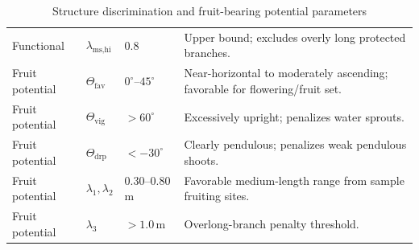 \documentclass[12pt,a4paper,fontset=fandol]{ctexart}
\begin{document}
\begin{table}[H]
\begin{tabularx}{\textwidth}{>{\raggedright\arraybackslash}p{2.1cm}>{\raggedright\arraybackslash}p{2.4cm}>{\raggedright\arraybackslash}p{1.9cm}>{\raggedright\arraybackslash}X}
Functional & $\lambda_{\text{ms,hi}}$ & $0.8$ & Upper bound; excludes overly long protected branches. \\
Fruit potential & $\Theta_{\text{fav}}$ & $0^\circ$--$45^\circ$ & Near-horizontal to moderately ascending; favorable for flowering/fruit set. \\
Fruit potential & $\Theta_{\text{vig}}$ & $>60^\circ$ & Excessively upright; penalizes water sprouts. \\
Fruit potential & $\Theta_{\text{drp}}$ & $<-30^\circ$ & Clearly pendulous; penalizes weak pendulous shoots. \\
Fruit potential & $\lambda_1,\lambda_2$ & $0.30$--$0.80$\,m & Favorable medium-length range from sample fruiting sites. \\
Fruit potential & $\lambda_3$ & $>1.0$\,m & Overlong-branch penalty threshold. \\
\bottomrule
\end{tabularx}
\caption{Structure discrimination and fruit-bearing potential parameters}
\label{tab:param_structure}
\end{table}
\end{document}

